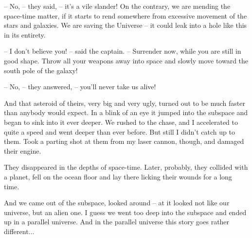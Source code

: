 \documentclass[ebook,oneside,final,openright]{memoir}
\begin{document}
– No, – they said, – it’s a vile slander! On the contrary, we are mending the space-time matter, if it starts to rend somewhere from excessive movement of the stars and galaxies. We are saving the Universe – it could leak into a hole like this in its entirety.\par
– I don’t believe you! – said the captain. – Surrender now, while you are still in good shape. Throw all your weapons away into space and slowly move toward the south pole of the galaxy!\par
– No, – they answered, – you’ll never take us alive!\par
And that asteroid of theirs, very big and very ugly, turned out to be much faster than anybody would expect. In a blink of an eye it jumped into the subspace and began to sink into it ever deeper. We rushed to the chase, and I accelerated to quite a speed and went deeper than ever before. But still I didn’t catch up to them. Took a parting shot at them from my laser cannon, though, and damaged their engine.\par
They disappeared in the depths of space-time. Later, probably, they collided with a planet, fell on the ocean floor and lay there licking their wounds for a long time.\par
And we came out of the subspace, looked around – at it looked not like our universe, but an alien one. I guess we went too deep into the subspace and ended up in a parallel universe. And in the parallel universe this story goes rather different...
\end{document}
